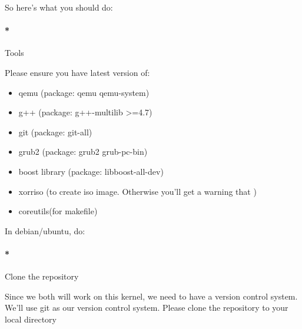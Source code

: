 \documentclass[]{article}
\newenvironment{Shaded}{}{}
\newcommand{\OperatorTok}[1]{{#1}}
\newcommand{\ExtensionTok}[1]{{#1}}
\newcommand{\NormalTok}[1]{{#1}}
\providecommand{\tightlist}{%
  \setlength{\itemsep}{0pt}\setlength{\parskip}{0pt}}
\let\oldparagraph\paragraph
\renewcommand{\paragraph}[1]{\oldparagraph{#1}\mbox{}}
\begin{document}
So here's what you should do:

\paragraph*{Tools}\label{tools}

Please ensure you have latest version of:

\begin{itemize}
\tightlist
\item
  qemu (package: qemu qemu-system)
\item
  g++ (package: g++-multilib \textgreater{}=4.7)
\item
  git (package: git-all)
\item
  grub2 (package: grub2 grub-pc-bin)
\item
  boost library (package: libboost-all-dev)
\item
  xorriso (to create iso image. Otherwise you'll get a warning that )
\item
  coreutils(for makefile)
\end{itemize}

In debian/ubuntu, do:

\begin{Shaded}
\end{Shaded}

\paragraph*{Clone the repository}\label{clone-the-repository}

Since we both will work on this kernel, we need to have a version
control system. We'll use git as our version control system. Please
clone the repository to your local directory

\begin{Shaded}
\end{Shaded}
\end{document}
